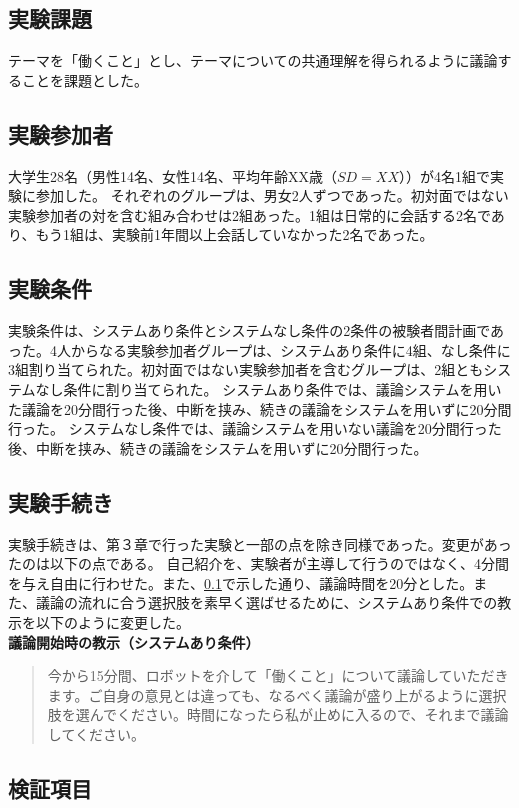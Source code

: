 \documentclass[11pt, a4paper]{jreport} %
\begin{document}
\subsection{実験課題}
\label{sec:jikkenkadai2}
テーマを「働くこと」とし、テーマについての共通理解を得られるように議論することを課題とした。

\subsection{実験参加者}
大学生28名（男性14名、女性14名、平均年齢XX歳（$SD=XX$））が4名1組で実験に参加した。
それぞれのグループは、男女2人ずつであった。初対面ではない実験参加者の対を含む組み合わせは2組あった。1組は日常的に会話する2名であり、もう1組は、実験前1年間以上会話していなかった2名であった。

\subsection{実験条件}
実験条件は、システムあり条件とシステムなし条件の2条件の被験者間計画であった。4人からなる実験参加者グループは、システムあり条件に4組、なし条件に3組割り当てられた。初対面ではない実験参加者を含むグループは、2組ともシステムなし条件に割り当てられた。
システムあり条件では、議論システムを用いた議論を20分間行った後、中断を挟み、続きの議論をシステムを用いずに20分間行った。
システムなし条件では、議論システムを用いない議論を20分間行った後、中断を挟み、続きの議論をシステムを用いずに20分間行った。

\subsection{実験手続き}
実験手続きは、第３章で行った実験と一部の点を除き同様であった。変更があったのは以下の点である。
自己紹介を、実験者が主導して行うのではなく、4分間を与え自由に行わせた。また、\ref{sec:jikkenkadai2}で示した通り、議論時間を20分とした。また、議論の流れに合う選択肢を素早く選ばせるために、システムあり条件での教示を以下のように変更した。\\
\textbf{議論開始時の教示（システムあり条件）}
\begin{quote}
今から15分間、ロボットを介して「働くこと」について議論していただきます。ご自身の意見とは違っても、なるべく議論が盛り上がるように選択肢を選んでください。時間になったら私が止めに入るので、それまで議論してください。
\end{quote}


\subsection{検証項目}
\end{document}
